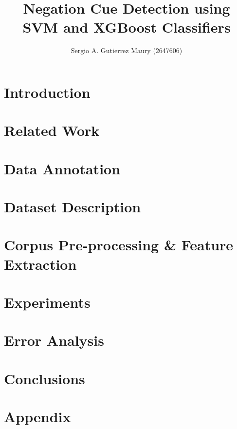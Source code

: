\documentclass[runningheads]{llncs}
\begin{document}
%
\title{Negation Cue Detection using SVM and XGBoost Classifiers}
%
%
\author{
Sergio A. Gutierrez Maury (2647606)
}
%
%
%
\maketitle              %

\begin{abstract}

\end{abstract}

\section{Introduction}

\section{Related Work \label{sec:relatedwork}}

\section{Data Annotation}

\section{Dataset Description}

\section{Corpus Pre-processing \& Feature Extraction \label{sec:featEx}}

\section{Experiments}

\section{Error Analysis \label{sec:error}}

\section{Conclusions}

\newpage
\printbibliography


\appendix
\section{Appendix}

\end{document}
